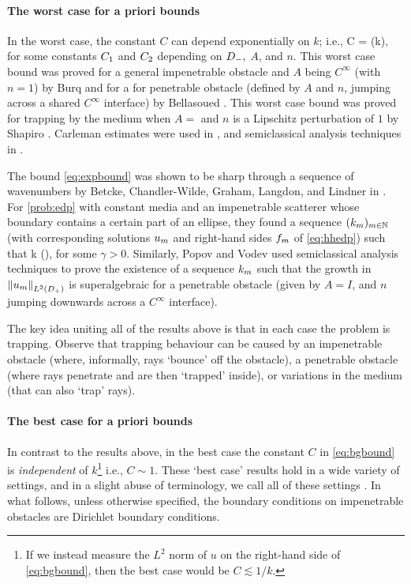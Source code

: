 \paragraph{The worst case for a priori bounds} In the worst case, the constant $C$ can depend exponentially on $k$; i.e.,
\beq\label{eq:expbound}
C = \Co \exp(k\Ct),
\eeq
for some constants $C_{1}$ and $C_{2}$ depending on $D_{-}, $ $A$, and $n$. This worst case bound was proved for a general impenetrable obstacle and $A$ being $C^\infty$  (with $n=1$) by Burq \cite{Bu:98} and for a for penetrable obstacle (defined by $A$ and $n$, jumping across a shared $C^\infty$ interface) by  Bellasoued \cite{Be:03}. This worst case bound was proved for trapping by the medium when $A=$ and $n$ is a Lipschitz perturbation of $1$ by Shapiro \cite{Sh:18}. Carleman estimates were used in \cite{Bu:98,Be:03}, and semiclassical analysis techniques in \cite{Sh:18}.

The bound \eqref{eq:expbound} was shown to be sharp through a sequence of wavenumbers by Betcke, Chandler-Wilde, Graham, Langdon, and Lindner in \cite[Equation 2.22]{BeChGrLaLi:11}. For \cref{prob:edp} with constant media and an impenetrable scatterer whose boundary contains a certain part of an ellipse, they found a sequence $(k_{m})_{m \in \mathbb N}$ (with corresponding solutions $u_{m}$ and right-hand sides $f_{m}$ of \eqref{eq:hhedp}) such that 
\beqs
k\NLtDp{\um} \gtrsim \exp\mleft(\gamma \km\mright)\NLtDp{\fm},
\eeqs
for some $\gamma > 0$. Similarly, Popov and Vodev \cite{PoVo:99a} used semiclassical analysis techniques to prove the existence of a sequence $k_{m}$ such that the growth in $\NLtDp{\um}$ is superalgebraic for a penetrable obstacle (given by $A=I$, and $n$ jumping downwards across a $C^\infty$ interface).

The key idea uniting all of the results above is that in each case the problem is trapping. Observe that trapping behaviour can be caused by an impenetrable obstacle (where, informally, rays `bounce' off the obstacle), a penetrable obstacle (where rays penetrate and are then `trapped' inside), or variations in the medium (that can also `trap' rays).

\paragraph{The best case for a priori bounds} In contrast to the results above, in the best case the constant $C$ in \cref{eq:bgbound} is \emph{independent}  of $k$\footnote{If we instead measure the $L^2$ norm of $u$ on the right-hand side of \cref{eq:bgbound}, then the best case would be $C \lesssim 1/k$.} i.e., $C \sim 1.$ These `best case' results hold in a wide variety of settings, and in a slight abuse of terminology, we call all of these settings . In what follows, unless otherwise specified, the boundary conditions on impenetrable obstacles are Dirichlet boundary conditions.

